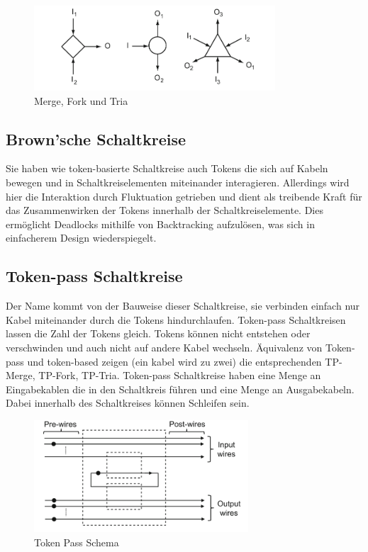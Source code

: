 \documentclass[11pt,a4paper]{article}
\begin{document}
\begin{figure}[h]
       \centering
       \includegraphics[width=9cm]{bilder/tokenBased.png}
       \caption{Merge, Fork und Tria}
\end{figure}    

%

\subsection{Brown'sche Schaltkreise}
Sie haben wie token-basierte Schaltkreise auch Tokens die sich auf Kabeln 
bewegen und in Schaltkreiselementen miteinander interagieren.
%
Allerdings wird hier die Interaktion durch Fluktuation getrieben und dient
als treibende Kraft für das Zusammenwirken der Tokens innerhalb der
Schaltkreiselemente. 
%
Dies ermöglicht Deadlocks mithilfe 
von Backtracking aufzulösen, was sich in einfacherem Design wiederspiegelt.


\subsection{Token-pass Schaltkreise}
Der Name kommt von der Bauweise dieser Schaltkreise, sie verbinden einfach nur
Kabel miteinander durch die Tokens hindurchlaufen.
%
Token-pass Schaltkreisen lassen die Zahl der Tokens gleich.
%
Tokens können nicht entstehen oder verschwinden und auch 
nicht auf andere Kabel wechseln.
%
Äquivalenz von Token-pass und token-based zeigen (ein kabel wird zu zwei)
die entsprechenden TP-Merge, TP-Fork, TP-Tria.
%
Token-pass Schaltkreise haben eine Menge an Eingabekablen die in
den Schaltkreis führen und eine Menge an Ausgabekabeln.
%
Dabei innerhalb des Schaltkreises können Schleifen sein. 
%

\begin{figure}[h]
    \centering
    \includegraphics[width=8cm]{bilder/TokenPassScheme.png}
    \caption{Token Pass Schema}
\end{figure} 
\end{document}
